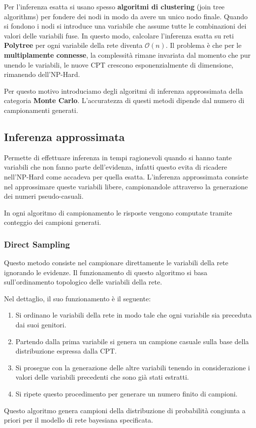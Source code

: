 Per l'inferenza esatta si usano spesso \textbf{algoritmi di clustering} (join
tree algorithms) per fondere dei nodi in modo da avere un unico nodo finale.
Quando si fondono i nodi si introduce una variabile che assume tutte le combinazioni
dei valori delle variabili fuse. In questo modo, calcolare l'inferenza esatta su
reti \textbf{Polytree} per ogni variabile della rete diventa $\mathcal{O}(n)$.
Il problema è che per le \textbf{multiplamente connesse}, la complessità rimane
invariata dal momento che pur unendo le variabili, le nuove CPT crescono
esponenzialmente di dimensione, rimanendo dell'NP-Hard.

Per questo motivo introduciamo degli algoritmi di inferenza approssimata della categoria
\textbf{Monte Carlo}. L'accuratezza di questi metodi dipende dal numero di campionamenti
generati.
\subsection{Inferenza approssimata}
Permette di effettuare inferenza in tempi ragionevoli quando si hanno tante
variabili che non fanno parte dell'evidenza, infatti questo evita di ricadere
nell'NP-Hard come accadeva per quella esatta. L'inferenza approssimata consiste
nel approssimare queste variabili libere, campionandole attraverso la generazione
dei numeri pseudo-casuali.

In ogni algoritmo di campionamento le risposte vengono computate tramite conteggio
dei campioni generati.

\subsubsection{Direct Sampling}
Questo metodo consiste nel campionare direttamente le variabili della rete ignorando
le evidenze. Il funzionamento di questo algoritmo si basa sull'ordinamento
topologico delle variabili della rete.

Nel dettaglio, il suo funzionamento è il seguente:
\begin{enumerate}
    \item Si ordinano le variabili della rete in modo tale che ogni variabile
          sia preceduta dai suoi genitori.
    \item Partendo dalla prima variabile si genera un campione casuale sulla base
          della distribuzione espressa dalla CPT.
    \item Si prosegue con la generazione delle altre variabili tenendo in
          considerazione i valori delle variabili precedenti che sono già stati
          estratti.
    \item Si ripete questo procedimento per generare un numero finito di campioni.
\end{enumerate}
Questo algoritmo genera campioni della distribuzione di probabilità congiunta a
priori per il modello di rete bayesiana specificata.

